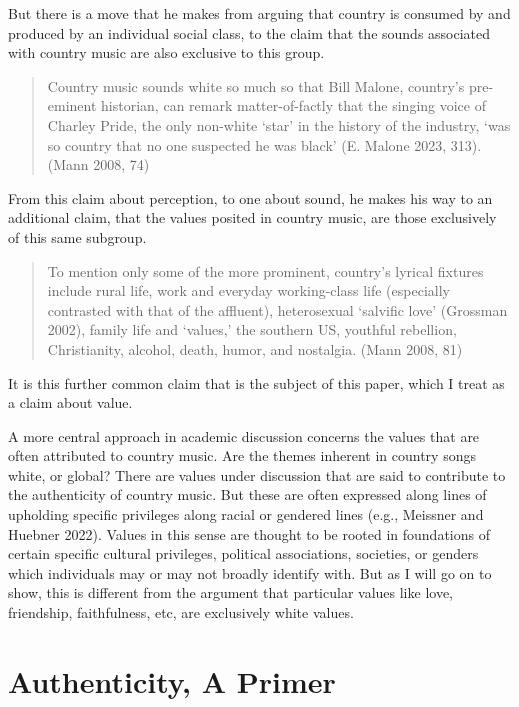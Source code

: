 \documentclass[12pt]{book}
\theoremstyle{definition}
\theoremstyle{remark}
\begin{document}
But there is a move that he makes from arguing that country is consumed by and produced by an individual social class, to the claim that the sounds associated with country music are also exclusive to this group.

\begin{quote}
Country music sounds white so much so that Bill Malone, country's pre-eminent historian, can remark matter-of-factly that the singing voice of Charley Pride, the only non-white `star' in the history of the industry, `was so country that no one suspected he was black' (E. Malone 2023, 313). (Mann 2008, 74)
\end{quote}

From this claim about perception, to one about sound, he makes his way to an additional claim, that the values posited in country music, are those exclusively of this same subgroup.

\begin{quote}
To mention only some of the more prominent, country's lyrical fixtures include rural life, work and everyday working-class life (especially contrasted with that of the affluent), heterosexual `salvific love' (Grossman 2002), family life and `values,' the southern US, youthful rebellion, Christianity, alcohol, death, humor, and nostalgia. (Mann 2008, 81)
\end{quote}

It is this further common claim that is the subject of this paper, which I treat as a claim about value.

A more central approach in academic discussion concerns the values that are often attributed to country music. Are the themes inherent in country songs white, or global? There are values under discussion that are said to contribute to the authenticity of country music. But these are often expressed along lines of upholding specific privileges along racial or gendered lines (e.g., Meissner and Huebner 2022). Values in this sense are thought to be rooted in foundations of certain specific cultural privileges, political associations, societies, or genders which individuals may or may not broadly identify with. But as I will go on to show, this is different from the argument that particular values like love, friendship, faithfulness, etc, are exclusively white values.

\section{Authenticity, A Primer}\label{authenticity-a-primer}
\end{document}
